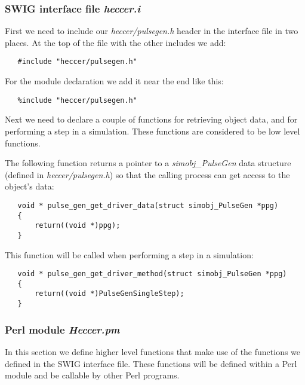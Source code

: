 \documentclass[12pt]{article}
\begin{document}
\subsubsection*{SWIG interface file {\it heccer.i}}

First we need to include our {\it heccer/pulsegen.h} header in the interface file in two places. At the top of the file with the other includes we add:
\begin{verbatim}
   #include "heccer/pulsegen.h"
\end{verbatim}
For the module declaration we add it near the end like this:
\begin{verbatim}
   %include "heccer/pulsegen.h"
\end{verbatim}
Next we need to declare a couple of functions for retrieving object data, and for performing a step in a simulation. These functions are considered to be low level functions.

The following function returns a pointer to a {\it simobj\_PulseGen{}} data structure (defined in {\it heccer/pulsegen.h}) so that the calling process can get access to the object's data:
\begin{verbatim}
   void * pulse_gen_get_driver_data(struct simobj_PulseGen *ppg)
   {
       return((void *)ppg);
   }
\end{verbatim}
This function will be called when performing a step in a simulation:
\begin{verbatim}
   void * pulse_gen_get_driver_method(struct simobj_PulseGen *ppg)
   {
       return((void *)PulseGenSingleStep);
   }
\end{verbatim}

\subsubsection*{Perl module {\it Heccer.pm}}

In this section we define higher level functions that make use of the functions we defined in the SWIG interface file. These functions will be defined within a Perl module and be callable by other Perl programs.
\end{document}
